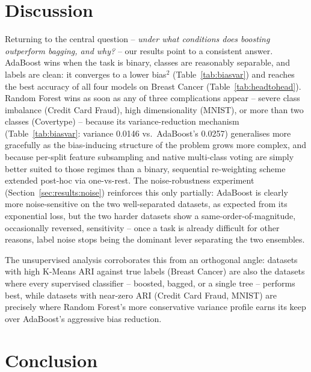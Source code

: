 \documentclass[conference]{IEEEtran}
\begin{document}
\section{Discussion}
\label{sec:discussion}

Returning to the central question -- \emph{under what conditions does
boosting outperform bagging, and why?} -- our results point to a consistent
answer. AdaBoost wins when the task is binary, classes are reasonably
separable, and labels are clean: it converges to a lower bias$^2$
(Table~\ref{tab:biasvar}) and reaches the best accuracy of all four models on
Breast Cancer (Table~\ref{tab:headtohead}). Random Forest wins as soon as any
of three complications appear -- severe class imbalance (Credit Card Fraud),
high dimensionality (MNIST), or more than two classes (Covertype) -- because
its variance-reduction mechanism (Table~\ref{tab:biasvar}: variance
0.0146 vs.\ AdaBoost's 0.0257) generalises more gracefully as the
bias-inducing structure of the problem grows more complex, and because
per-split feature subsampling and native multi-class voting are simply
better suited to those regimes than a binary, sequential re-weighting
scheme extended post-hoc via one-vs-rest. The noise-robustness experiment
(Section~\ref{sec:results:noise}) reinforces this only partially: AdaBoost
is clearly more noise-sensitive on the two well-separated datasets, as
expected from its exponential loss, but the two harder datasets show a
same-order-of-magnitude, occasionally reversed, sensitivity -- once a task
is already difficult for other reasons, label noise stops being the
dominant lever separating the two ensembles.

The unsupervised analysis corroborates this from an orthogonal angle:
datasets with high K-Means ARI against true labels (Breast Cancer) are also
the datasets where every supervised classifier -- boosted, bagged, or a
single tree -- performs best, while datasets with near-zero ARI (Credit Card
Fraud, MNIST) are precisely where Random Forest's more conservative variance
profile earns its keep over AdaBoost's aggressive bias reduction.

\section{Conclusion}
\label{sec:conclusion}
\end{document}
